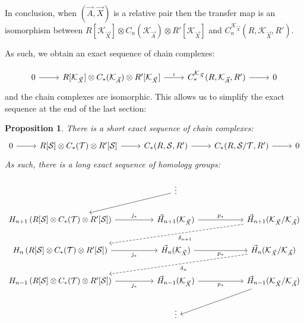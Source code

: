 \documentclass[a4paper,fleqn]{cas-sc}
\newtheorem{prop}[thm]{Proposition}%
\newcommand{\G}{\Vec{H}}
\newcommand{\K}{\mathcal{K}}
\newcommand{\cS}{{\mathcal{S}}}
\newcommand{\cT}{{\mathcal{T}}}
\begin{document}
In conclusion, when $(\Vec{A}, \Vec{X})$ is a relative pair then the transfer map is an isomorphism between $R[\K_{\Vec{X}}] \otimes C_n(\K_{\Vec{A}}) \otimes R'[\K_{\Vec{X}}]$ and $C_n^{\K_{\Vec{X}}} (R, \K_{\Vec{X}}, R')$.

As such, we obtain an exact sequence of chain complexes:

\[\begin{tikzcd}
	0 & R[\K_{\Vec{X}}] \otimes C_*(\K_{\Vec{A}}) \otimes R'[\K_{\Vec{X}}] & C_*^{\K_{\Vec{X}}}(R, \K_{\Vec{A}}, R') & 0
	\arrow[from=1-1, to=1-2]
	\arrow["\iota", from=1-2, to=1-3]
	\arrow[ from=1-3, to=1-4]
\end{tikzcd}\]
and the chain complexes are isomorphic. This allows us to simplify the exact sequence at the end of the last section:

\begin{prop}
There is a short exact sequence of chain complexes:
\[\begin{tikzcd}
	0 & {R[\cS] \otimes C_{*}(\cT) \otimes R'[\cS]} & {C_*(R, \cS, R')} & {C_*(R, \cS/ \cT, R')} & 0
	\arrow[from=1-1, to=1-2]
	\arrow[from=1-2, to=1-3]
	\arrow[from=1-3, to=1-4]
	\arrow[from=1-4, to=1-5]
\end{tikzcd}\]
As such, there is a long exact sequence of homology groups:

\[\begin{tikzcd}
	&& \vdots \\
	H_{n+1} \left(  {R[\cS] \otimes C_{*}(\cT) \otimes R'[\cS]}\right) &&
	\G_{n+1}(\K_{\Vec{X}}) &&
	\G_{n+1}(\K_{\Vec{X}}/ \K_{\Vec{A}}) \\
	H_n\left( {R[\cS] \otimes C_{*}(\cT) \otimes R'[\cS]}\right) &&
	\G_{n}( \K_{\Vec{X}}) && 
	\G_n(\K_{\Vec{X}}/ \K_{\Vec{A}})\\
	H_{n-1}\left(  {R[\cS] \otimes C_{*}(\cT) \otimes R'[\cS]}\right) &&
	\G_{n-1}(\K_{\Vec{X}}) && 
	\G_{n-1}(\K_{\Vec{X}}/ \K_{\Vec{A}}) \\
	&& \vdots & {}
	\arrow[from=1-3, to=2-1]
	\arrow["{j_*}", from=2-1, to=2-3]
	\arrow["{p_*}", from=2-3, to=2-5]
	\arrow[dashed, "{\delta_{n+1}}", from=2-5, to=3-1]
	\arrow["{j_*}"', from=3-1, to=3-3]
	\arrow["{p_*}"', from=3-3, to=3-5]
	\arrow[dashed, "{\delta_{n}}", from=3-5, to=4-1]
	\arrow["{j_*}"', from=4-1, to=4-3]
	\arrow["{p_*}"', from=4-3, to=4-5]
	\arrow[from=4-5, to=5-3]
\end{tikzcd}\]
\end{prop}
\end{document}
